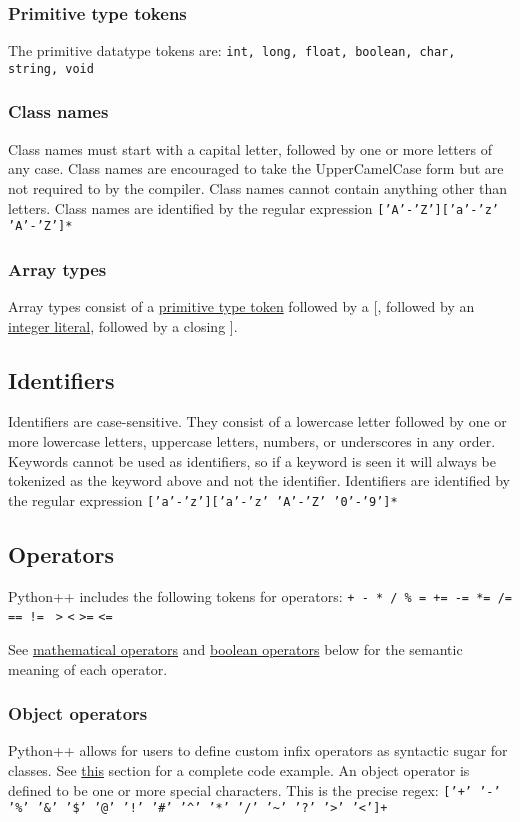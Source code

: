 \documentclass{article}
\begin{document}
\subsubsection{Primitive type tokens}
\label{sec:primitivetypetokens}
The primitive datatype tokens are: \texttt{int, long, float, boolean, char, string, void}

\subsubsection{Class names}
Class names must start with a capital letter, followed by one or more letters of any case. Class names are encouraged to take the UpperCamelCase form but are not required to by the compiler. Class names cannot contain anything other than letters. Class names are identified by the regular expression \texttt{['A'-'Z']['a'-'z' 'A'-'Z']*}

\subsubsection{Array types}
Array types consist of a \hyperref[sec:primitivetypetokens]{primitive type token} followed by a [, followed by an \hyperref[sec:intliterals]{integer literal}, followed by a closing ].

\subsection{Identifiers}
Identifiers are case-sensitive. They consist of a lowercase letter followed by one or more lowercase letters, uppercase letters, numbers, or underscores in any order. Keywords cannot be used as identifiers, so if a keyword is seen it will always be tokenized as the keyword above and not the identifier. Identifiers are identified by the regular expression \texttt{['a'-'z']['a'-'z' 'A'-'Z' '0'-'9']*}

\subsection{Operators}
Python++ includes the following tokens for operators: \texttt{+ - * / \% = += -= *= /= == != } \texttt{>} \texttt{<} \texttt{>=} \texttt{<=}

See \hyperref[sec:expr-mathematical-operators]{mathematical operators} and \hyperref[sec:expr-boolean-operators]{boolean operators} below for the semantic meaning of each operator.

\subsubsection{Object operators}
Python++ allows for users to define custom infix operators as syntactic sugar for classes. See \hyperref[sec:object-operators]{this} section for a complete code example. An object operator is defined to be one or more special characters. This is the precise regex: \texttt{['+' '-' '\%' '\&' '\$' '@' '!' '\#' '\^{}' '*' '/' '\~{}' '?' '}\texttt{>}\texttt{' '}\texttt{<}\texttt{']+}
\end{document}

